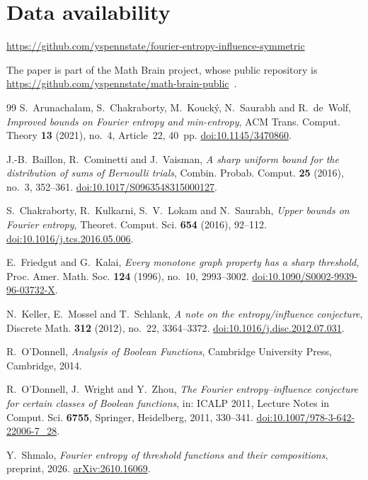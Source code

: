 \documentclass[11pt]{amsart}
\theoremstyle{definition}
\theoremstyle{remark}
\begin{document}
\section*{Data availability}
\url{https://github.com/yspennstate/fourier-entropy-influence-symmetric}

The paper is part of the Math Brain project, whose public repository is \url{https://github.com/yspennstate/math-brain-public}~\cite{MathBrainRepo}.

\begin{thebibliography}{99}
S.~Arunachalam, S.~Chakraborty, M.~Kouck\'y, N.~Saurabh and R.~de~Wolf,
\emph{Improved bounds on Fourier entropy and min-entropy},
ACM Trans. Comput. Theory \textbf{13} (2021), no.~4, Article~22, 40~pp.
\href{https://doi.org/10.1145/3470860}{doi:10.1145/3470860}.

J.-B.~Baillon, R.~Cominetti and J.~Vaisman,
\emph{A sharp uniform bound for the distribution of sums of Bernoulli trials},
Combin. Probab. Comput. \textbf{25} (2016), no.~3, 352--361.
\href{https://doi.org/10.1017/S0963548315000127}{doi:10.1017/S0963548315000127}.

S.~Chakraborty, R.~Kulkarni, S.~V.~Lokam and N.~Saurabh,
\emph{Upper bounds on Fourier entropy},
Theoret. Comput. Sci. \textbf{654} (2016), 92--112.
\href{https://doi.org/10.1016/j.tcs.2016.05.006}{doi:10.1016/j.tcs.2016.05.006}.

E.~Friedgut and G.~Kalai,
\emph{Every monotone graph property has a sharp threshold},
Proc. Amer. Math. Soc. \textbf{124} (1996), no.~10, 2993--3002.
\href{https://doi.org/10.1090/S0002-9939-96-03732-X}{doi:10.1090/S0002-9939-96-03732-X}.

N.~Keller, E.~Mossel and T.~Schlank,
\emph{A note on the entropy/influence conjecture},
Discrete Math. \textbf{312} (2012), no.~22, 3364--3372.
\href{https://doi.org/10.1016/j.disc.2012.07.031}{doi:10.1016/j.disc.2012.07.031}.

R.~O'Donnell,
\emph{Analysis of Boolean Functions},
Cambridge University Press, Cambridge, 2014.

R.~O'Donnell, J.~Wright and Y.~Zhou,
\emph{The Fourier entropy--influence conjecture for certain classes of Boolean functions},
in: ICALP 2011, Lecture Notes in Comput. Sci. \textbf{6755}, Springer, Heidelberg, 2011, 330--341.
\href{https://doi.org/10.1007/978-3-642-22006-7_28}{doi:10.1007/978-3-642-22006-7\_28}.

Y.~Shmalo,
\emph{Fourier entropy of threshold functions and their compositions},
preprint, 2026.
\href{https://arxiv.org/abs/2610.16069}{arXiv:2610.16069}.


\end{thebibliography}
\end{document}
